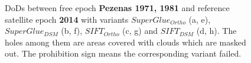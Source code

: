 \begin{figure}[htbp]
\begin{center}
		
		\caption{{ \ac{DoD}s between free epoch \textbf{Pezenas 1971, 1981} and reference satellite epoch \textbf{2014} with variants $SuperGlue_{Ortho}$ (a, e), $SuperGlue_{DSM}$ (b, f), $SIFT_{Ortho}$ (c, g) and $SIFT_{DSM}$ (d, h). The holes among them are areas covered with clouds which are masked out. The prohibition sign means the corresponding variant failed.}}
		\label{DoDPezenas-Satellite}
	\end{center}
\end{figure} 


